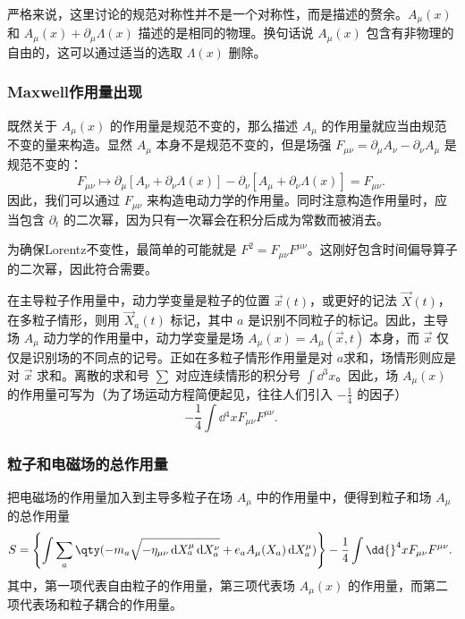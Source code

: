 严格来说，这里讨论的规范对称性并不是一个对称性，而是描述的赘余。$A_\mu(x)$ 和 $A_\mu(x)+\partial_\mu\Lambda(x)$ 描述的是相同的物理。换句话说 $A_\mu(x)$ 包含有非物理的自由的，这可以通过适当的选取 $\Lambda(x)$ 删除。

\subsubsection{Maxwell作用量出现}

既然关于 $A_\mu(x)$ 的作用量是规范不变的，那么描述 $A_\mu$ 的作用量就应当由规范不变的量来构造。显然 $A_\mu$ 本身不是规范不变的，但是场强 $F_{\mu\nu}=\partial_\mu A_\nu-\partial_\nu A_\mu$ 是规范不变的：
\begin{equation}
F_{\mu\nu}\mapsto \partial_\mu[ A_\nu+\partial_\nu\Lambda(x)]-\partial_\nu[ A_\mu+\partial_\nu\Lambda(x)]=F_{\mu\nu}.~
\end{equation}
因此，我们可以通过 $F_{\mu\nu}$ 来构造电动力学的作用量。同时注意构造作用量时，应当包含 $\partial_t$ 的二次幂，因为只有一次幂会在积分后成为常数而被消去。

为确保Lorentz不变性，最简单的可能就是 $F^2=F_{\mu\nu}F^{\mu\nu}$。这刚好包含时间偏导算子的二次幂，因此符合需要。

在主导粒子作用量中，动力学变量是粒子的位置 $\vec x(t)$，或更好的记法 $\vec X(t)$，在多粒子情形，则用 $\vec X_a(t)$ 标记，其中 $a$ 是识别不同粒子的标记。因此，主导场 $A_\mu$ 动力学的作用量中，动力学变量是场 $A_\mu(x)=A_\mu(\vec x,t)$ 本身，而 $\vec x$ 仅仅是识别场的不同点的记号。正如在多粒子情形作用量是对 $a$求和，场情形则应是对 $\vec x$ 求和。离散的求和号 $\sum$ 对应连续情形的积分号 $\int\dd{}^3 x$。因此，场 $A_\mu(x)$ 的作用量可写为（为了场运动方程简便起见，往往人们引入 $-\frac{1}{4}$ 的因子）
\begin{equation}
-\frac{1}{4}\int\dd{}^4 x F_{\mu\nu}F^{\mu\nu}.~
\end{equation}

\subsubsection{粒子和电磁场的总作用量}

把电磁场的作用量加入到主导多粒子在场 $A_\mu$ 中的作用量中，便得到粒子和场 $A_\mu$ 的总作用量
\begin{equation}
 S=\left\{\int\sum_a\qty(-m_a\sqrt{-\eta_{\mu\nu} \,\mathrm{d} X_a ^\mu \,\mathrm{d}X_a ^\nu}+e_aA_\mu(X_a) \,\mathrm{d}X_a ^\mu) \right\}-\frac{1}{4}\int\dd{}^4 x F_{\mu\nu}F^{\mu\nu}.~
\end{equation}
其中，第一项代表自由粒子的作用量，第三项代表场 $A_\mu(x)$ 的作用量，而第二项代表场和粒子耦合的作用量。









